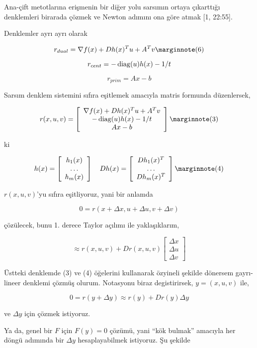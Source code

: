 \documentclass[12pt,fleqn]{article}\usepackage{../../common}
\begin{document}
Ana-çift metotlarına erişmenin bir diğer yolu sarsımın ortaya çıkarttığı
denklemleri birarada çözmek ve Newton adımını ona göre atmak [1, 22:55]. 

Denklemler ayrı ayrı olarak 

$$
r_{dual}= \nabla f(x) + Dh(x)^T u + A^T v 
\mlabel{6}
$$

$$
r_{cent} = -\operatorname{diag}(u)h(x) - 1/t 
$$

$$
r_{prim} = Ax - b
$$

Sarsım denklem sistemini sıfıra eşitlemek amacıyla matris formunda
düzenlersek, 

$$
r(x,u,v) = 
\left[\begin{array}{c}
\nabla f(x) + Dh(x)^T u + A^T v \\
-\diag(u)h(x) - 1/t \\
Ax - b
\end{array}\right]
\mlabel{3}
$$

ki

$$
h(x) = \left[\begin{array}{c}
h_1(x) \\
\dots \\
h_m(x)
\end{array}\right]
\quad
D h(x) = \left[\begin{array}{c}
D h_1(x)^T \\
\dots \\
D h_m(x)^T
\end{array}\right]
\mlabel{4}
$$

$r(x,u,v)$'yu sıfıra eşitliyoruz, yani bir anlamda 

$$
0 = r (x+\Delta x, u + \Delta u, v + \Delta v)
$$

çözülecek, bunu 1. derece Taylor açılımı ile yaklaşıklarım,

$$
\approx r(x,u,v) + D r(x,u,v) \left[\begin{array}{c}
\Delta x \\ \Delta u \\ \Delta v
\end{array}\right]
$$

Üstteki denklemde (3) ve (4) öğelerini kullanarak özyineli şekilde dönersem
gayrı-lineer denklemi çözmüş olurum. Notasyonu biraz degistirirsek,
$y = (x,u,v)$ ile,

$$
0 = r(y + \Delta y) \approx r(y) + D r(y) \Delta y
$$

ve $\Delta y$ için çözmek istiyoruz. 

Ya da, genel bir $F$ için $F(y) = 0$ çözümü, yani ``kök bulmak'' amacıyla
her döngü adımında bir $\Delta y$ hesaplayabilmek istiyoruz. Şu şekilde
\end{document}
